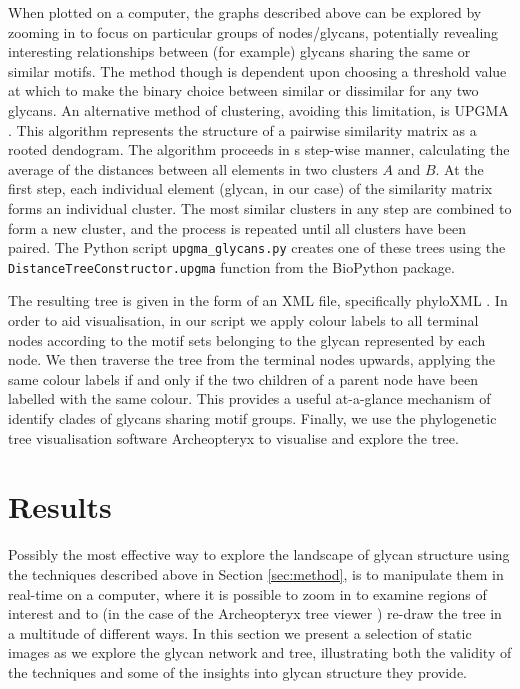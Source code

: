 \documentclass[12pt,a4paper]{article}
\begin{document}
When plotted on a computer, the graphs described above can be explored by zooming in to focus on particular groups of nodes/glycans, potentially revealing interesting relationships between (for example) glycans sharing the same or similar motifs. The method though is dependent upon choosing a threshold value at which to make the binary choice between similar or dissimilar for any two glycans. An alternative method of clustering, avoiding this limitation, is UPGMA \citep{gronau2007optimal}. This algorithm represents the structure of a pairwise similarity matrix as a rooted dendogram. The algorithm proceeds in s step-wise manner, calculating the average of the distances between all elements in two clusters $A$ and $B$. At the first step, each individual element (glycan, in our case) of the similarity matrix forms an individual cluster. The most similar clusters in any step are combined to form a new cluster, and the process is repeated until all clusters have been paired. The Python script \texttt{upgma\_glycans.py} creates one of these trees using the \texttt{DistanceTreeConstructor.upgma} function from the BioPython \citep{cock2009biopython} package.

The resulting tree is given in the form of an XML file, specifically phyloXML \citep{han2009phyloxml}. In order to aid visualisation, in our script  we apply colour labels to all terminal nodes according to the motif sets belonging to the glycan represented by each node. We then traverse the tree from the terminal nodes upwards, applying the same colour labels if and only if the two children of a parent node have been labelled with the same colour. This provides a useful at-a-glance mechanism of identify clades of glycans sharing motif groups. Finally, we use the phylogenetic tree visualisation software Archeopteryx \citep{han2009phyloxml} to visualise and explore the tree.


\newpage
\section{Results}
\label{sec:results}

Possibly the most effective way to explore the landscape of glycan structure using the techniques described above in Section \ref{sec:method}, is to manipulate them in real-time on a computer, where it is possible to zoom in to examine regions of interest and to (in the case of the Archeopteryx tree viewer ) re-draw the tree in a multitude of different ways. In this section we present a selection of static images as we explore the glycan network and tree, illustrating both the validity of the techniques and some of the insights into glycan structure they provide.
\end{document}
